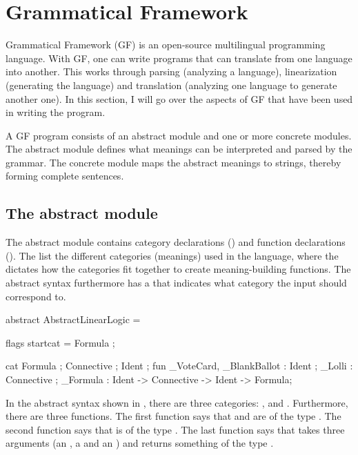 \section{Grammatical Framework}
\label{03_02}

Grammatical Framework (GF) is an open-source multilingual programming language. With GF, one can write programs that can translate from one language into another. This works through parsing (analyzing a language), linearization (generating the language) and translation (analyzing one language to generate another one). In this section, I will go over the aspects of GF that have been used in writing the program.

A GF program consists of an abstract module and one or more concrete modules. The abstract module defines what meanings can be interpreted and parsed by the grammar. The concrete module maps the abstract meanings to strings, thereby forming complete sentences.

\subsection{The abstract module}
\label{03_02_01}

The abstract module contains category declarations () and function declarations (). The  list the different categories (meanings) used in the language, where the  dictates how the categories fit together to create meaning-building functions. The abstract syntax furthermore has a  that indicates what category the input should correspond to.

\begin{lstgf}
abstract AbstractLinearLogic = {
    flags startcat = Formula ;
    
    cat 
        Formula ; Connective ; Ident ;
    fun 
        _VoteCard, _BlankBallot : Ident ;
        _Lolli : Connective ;
        _Formula : Ident -> Connective -> Ident -> Formula;
}
\end{lstgf}

In the abstract syntax shown in , there are three categories: ,  and . Furthermore, there are three functions. The first function says that  and  are of the type . The second function says that  is of the type . The last function says that  takes three arguments (an , a  and an ) and returns something of the type .

